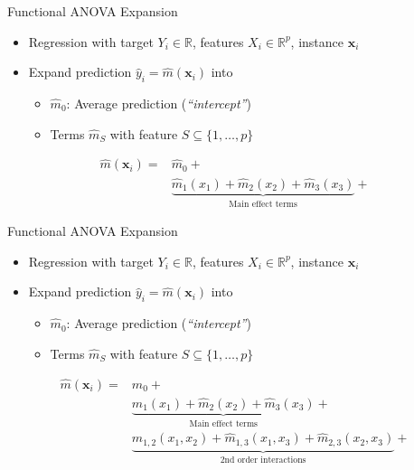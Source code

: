 \documentclass[aspectratio=169,12pt]{beamer}
\providecommand{\tightlist}{%
  \setlength{\itemsep}{2pt}\setlength{\parskip}{0pt}}
\begin{document}
\begin{frame}{Functional ANOVA Expansion}
\label{functional-anova-expansion}
\begin{itemize}[<+->]
\tightlist
\item
  Regression with target \(Y_i \in \mathbb{R}\), features
  \(X_i \in \mathbb{R}^p\), instance \(\mathbf{x}_i\)
\item
  Expand prediction \(\hat{y}_i = \hat{m}(\mathbf{x}_i)\) into

  \begin{itemize}[<+->]
  \tightlist
  \item
    \(\hat{m}_{0}\): Average prediction (\emph{``intercept''})
  \item
    Terms \(\hat{m}_S\) with feature \(S \subseteq \{1, \ldots, p\}\)
  \end{itemize}
\end{itemize}

\pause

\vfill

\begin{align*}
\hat{m}(\mathbf{x}_i) = & \hat{m}_{0} + \\
&  \underbrace{\hat{m}_1(x_1) + \hat{m}_2(x_2) + \hat{m}_3(x_3)}_{\text{Main effect terms}} +
\end{align*}

\vfill
\end{frame}

\begin{frame}{Functional ANOVA Expansion}
\label{functional-anova-expansion-1}
\begin{itemize}
\tightlist
\item
  Regression with target \(Y_i \in \mathbb{R}\), features
  \(X_i \in \mathbb{R}^p\), instance \(\mathbf{x}_i\)
\item
  Expand prediction \(\hat{y}_i = \hat{m}(\mathbf{x}_i)\) into

  \begin{itemize}
  \tightlist
  \item
    \(\hat{m}_{0}\): Average prediction (\emph{``intercept''})
  \item
    Terms \(\hat{m}_S\) with feature \(S \subseteq \{1, \ldots, p\}\)
  \end{itemize}
\end{itemize}

\vfill

\begin{align*}
\hat{m}(\mathbf{x}_i) = & \hat{m}_{0} + \\
&  \underbrace{\hat{m}_1(x_1) + \hat{m}_2(x_2) + \hat{m}_3(x_3)}_{\text{Main effect terms}} + \\
&  \underbrace{\hat{m}_{1,2}(x_1,x_2) + \hat{m}_{1,3}(x_1,x_3) + \hat{m}_{2,3}(x_2,x_3)}_{\text{2nd order interactions}} +
\end{align*}

\vfill
\end{frame}
\end{document}
